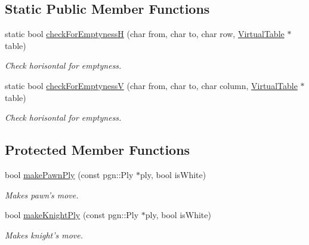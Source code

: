 \subsection*{Static Public Member Functions}
\begin{DoxyCompactItemize}
\item 
static bool \hyperlink{classChEngn_1_1Engine_aebba3d5fac90f1e829fc122b31f26064}{checkForEmptynessH} (char from, char to, char row, \hyperlink{classChEngn_1_1Table}{VirtualTable} $\ast$table)
\begin{DoxyCompactList}\small\item\em Check horisontal for emptyness. \item\end{DoxyCompactList}\item 
static bool \hyperlink{classChEngn_1_1Engine_ab812e459beb68c21e02370d0f7767299}{checkForEmptynessV} (char from, char to, char column, \hyperlink{classChEngn_1_1Table}{VirtualTable} $\ast$table)
\begin{DoxyCompactList}\small\item\em Check horisontal for emptyness. \item\end{DoxyCompactList}\end{DoxyCompactItemize}
\subsection*{Protected Member Functions}
\begin{DoxyCompactItemize}
\item 
bool \hyperlink{classChEngn_1_1Engine_a5ee94d0b489d05ef5e643cb9cfe5ac1a}{makePawnPly} (const pgn::Ply $\ast$ply, bool isWhite)
\begin{DoxyCompactList}\small\item\em Makes pawn's move. \item\end{DoxyCompactList}\item 
bool \hyperlink{classChEngn_1_1Engine_a1dc6130dd986b0b0b8960a3c1e99f87c}{makeKnightPly} (const pgn::Ply $\ast$ply, bool isWhite)
\begin{DoxyCompactList}\small\item\em Makes knight's move. \item\end{DoxyCompactList}\end{DoxyCompactItemize}

